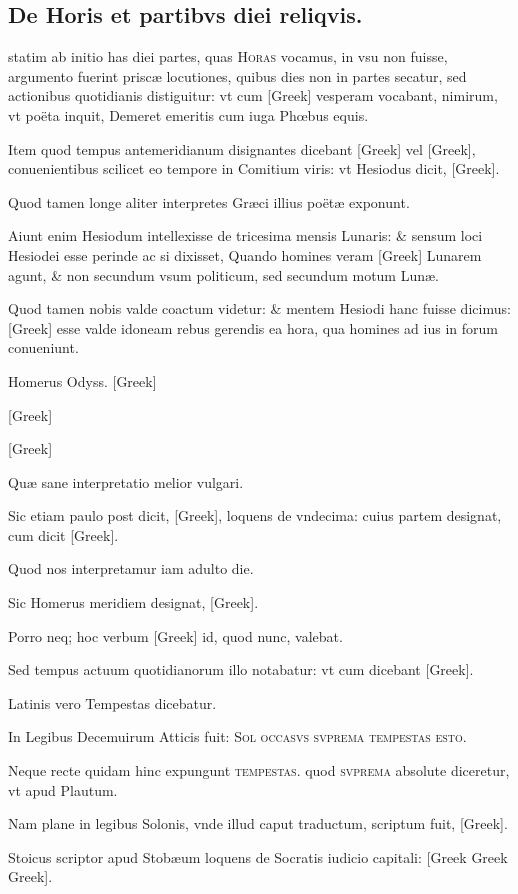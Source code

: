 \subsection[De Horis \& partibus diei reliquis.]{De Horis et partibvs diei reliqvis.}
\setcounter{parcount}{0}
\begin{parnumbers}

 statim ab initio has diei partes, quas \textsc{Horas} vocamus, in vsu non fuisse, argumento fuerint priscæ locutiones,  quibus dies non in partes secatur, sed actionibus quotidianis distiguitur: vt cum \textgreek{[Greek]} vesperam vocabant, nimirum, vt poëta inquit, Demeret emeritis cum iuga Phœbus equis.

Item quod tempus antemeridianum disignantes dicebant \textgreek{[Greek]} vel \textgreek{[Greek]}, conuenientibus scilicet eo tempore in Comitium viris: vt Hesiodus dicit, \textgreek{[Greek]}.

Quod tamen longe aliter interpretes Græci illius poëtæ exponunt.

Aiunt enim Hesiodum intellexisse de tricesima mensis Lunaris: \& sensum loci Hesiodei esse perinde ac si dixisset, Quando homines veram \textgreek{[Greek]} Lunarem agunt, \& non secundum vsum politicum, sed secundum motum Lunæ.

Quod  tamen nobis valde coactum videtur: \& mentem Hesiodi hanc fuisse dicimus: \textgreek{[Greek]} esse valde idoneam rebus gerendis ea hora, qua homines ad ius in forum conueniunt.

Homerus Odyss. \textgreek{[Greek]}

\textgreek{[Greek]}

\textgreek{[Greek]}

Quæ sane interpretatio melior vulgari.

Sic etiam paulo post dicit, \textgreek{[Greek]}, loquens de vndecima: cuius partem designat, cum dicit \textgreek{[Greek]}.

Quod nos interpretamur iam adulto die.

Sic Homerus meridiem designat, \textgreek{[Greek]}.

Porro neq; hoc verbum \textgreek{[Greek]} id, quod nunc, valebat.

Sed tempus actuum quotidianorum illo notabatur: vt cum dicebant \textgreek{[Greek]}.

 Latinis vero Tempestas dicebatur.

In Legibus Decemuirum Atticis fuit: \textsc{Sol\hspace{0.5em} occasvs\hspace{0.5em} svprema\hspace{0.5em} tempestas\hspace{0.5em} esto}.

Neque recte quidam hinc expungunt \textsc{tempestas}. quod \textsc{svprema} absolute diceretur, vt apud Plautum.

Nam plane in legibus Solonis, vnde illud caput traductum, scriptum fuit, \textgreek{[Greek]}.

Stoicus scriptor apud Stobæum loquens de Socratis iudicio capitali: [Greek Greek Greek].

\end{parnumbers}
